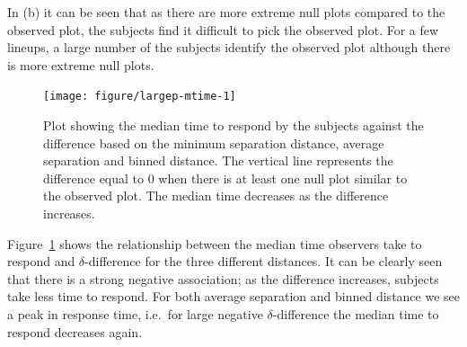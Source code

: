 \documentclass[12pt]{article}\usepackage[]{graphicx}\usepackage[]{color}
\newenvironment{knitrout}{}{} %
\begin{document}
In (b) it can be seen that as there are more extreme null plots compared to the observed plot, the subjects find it difficult to pick the observed plot. For a few lineups, a large number of the subjects identify the observed plot although there is more extreme null plots. 

\begin{figure}[!h]
\centering
\begin{knitrout}
\color{fgcolor}
\texttt{[image: figure/largep-mtime-1]} 

\end{knitrout}

	\vspace{-.1in}
\caption{Plot showing the median time to respond by the subjects against the difference based on the minimum separation distance, average separation and binned distance. The vertical line represents the difference equal to 0 when there is at least one null plot similar to the observed plot. The median time decreases as the difference increases.  }
\label{lp-mtime}
\end{figure}

Figure~\ref{lp-mtime} shows the relationship between the median time observers take to respond  and $\delta$-difference for the three different distances. It can be clearly seen that there is a strong negative association; as the difference increases,  subjects take less time to respond. %
For both average separation and binned distance we see a peak in response time, i.e.\ for large negative $\delta$-difference the median time to respond decreases again.
\end{document}
